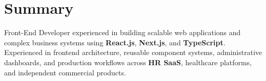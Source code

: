 \section{Summary}
  \resumeSubHeadingListStart
    Front-End Developer experienced in building scalable web applications and complex business systems using \textbf{React.js}, \textbf{Next.js}, and \textbf{TypeScript}. Experienced in frontend architecture, reusable component systems, administrative dashboards, and production workflows across \textbf{HR SaaS}, healthcare platforms, and independent commercial products.
  \resumeSubHeadingListEnd